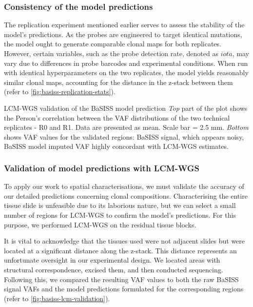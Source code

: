 \subsubsection*{Consistency of the model predictions}
The replication experiment mentioned earlier serves to assess the stability of the model's predictions. As the probes are engineered to target identical mutations, the model ought to generate comparable clonal maps for both replicates. However, certain variables, such as the probe detection rate, denoted as $iota$, may vary due to differences in probe barcodes and experimental conditions. When run with identical hyperparameters on the two replicates, the model yields reasonably similar clonal maps, accounting for the distance in the z-stack between them (refer to \cref{fig:basiss-replication-stats}).

    {\ac{LCM}-\ac{WGS} validation of the \ac{BaSISS} model prediction}
    {\emph{Top} part of the plot shows the Person's correlation between the \ac{VAF} distributions of the two technical replicates - R0 and R1. Data are presented as mean. Scale bar = 2.5 mm. \emph{Bottom} shows \ac{VAF} values for the validated regions: \ac{BaSISS} signal, which appears noisy, \ac{BaSISS} model imputed \ac{VAF} highly concordant with \ac{LCM}-\ac{WGS} estimates.}

\subsubsection*{Validation of model predictions with \ac{LCM}-\ac{WGS}}
To apply our work to spatial characterisations, we must validate the accuracy of our detailed predictions concerning clonal compositions. Characterising the entire tissue slide is unfeasible due to its laborious nature, but we can select a small number of regions for \ac{LCM}-\ac{WGS} to confirm the model's predictions. For this purpose, we performed \ac{LCM}-\ac{WGS} on the residual tissue blocks.

It is vital to acknowledge that the tissues used were not adjacent slides but were located at a significant distance along the z-stack. This distance represents an unfortunate oversight in our experimental design. We located areas with structural correspondence, excised them, and then conducted sequencing. Following this, we compared the resulting \ac{VAF} values to both the raw \ac{BaSISS} signal \ac{VAF}s and the model predictions formulated for the corresponding regions (refer to \cref{fig:basiss-lcm-validation}).

